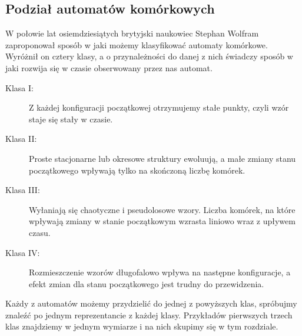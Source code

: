\documentclass[a4paper,12pt]{article}
\begin{document}
\subsection{Podział automatów komórkowych}
W połowie lat osiemdziesiątych brytyjski naukowiec Stephan Wolfram zaproponował sposób w jaki możemy klasyfikować automaty komórkowe. Wyróżnił on cztery klasy, a o przynależności do danej z nich świadczy sposób w jaki rozwija się w czasie obserwowany przez nas automat.
\begin{description}
\item[Klasa I:] Z każdej konfiguracji początkowej otrzymujemy stałe punkty, czyli wzór staje się stały w czasie.
\item[Klasa II:] Proste stacjonarne lub okresowe struktury ewoluują, a małe zmiany stanu początkowego wpływają tylko na skończoną liczbę komórek.
\item[Klasa III:] Wyłaniają się chaotyczne i pseudolosowe wzory. Liczba komórek, na które wpływają zmiany w stanie początkowym wzrasta liniowo wraz z upływem czasu.
\item[Klasa IV:] Rozmieszczenie wzorów długofalowo wpływa na następne konfiguracje, a efekt zmian dla stanu początkowego jest trudny do przewidzenia. 
\end{description}
Każdy z automatów możemy przydzielić do jednej z powyższych klas, spróbujmy znaleźć po jednym reprezentancie z każdej klasy. Przykładów pierwszych trzech klas znajdziemy w jednym wymiarze i na nich skupimy się w tym rozdziale.
\end{document}
